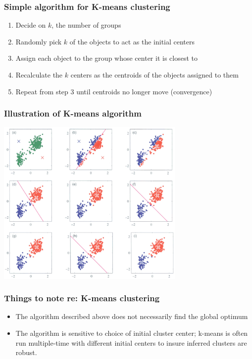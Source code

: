 \documentclass{beamer}
\begin{document}
\begin{frame}
\frametitle{Simple algorithm for K-means clustering}

\begin{enumerate}
\item Decide on $k$, the number of groups

\item Randomly pick $k$ of the objects to act as the initial centers

\item Assign each object to the group whose center it is closest to

\item Recalculate the $k$ centers as the centroids of the objects assigned to them

\item Repeat from step 3 until centroids no longer move (convergence)

\end{enumerate}

\end{frame}

\begin{frame}
\frametitle{Illustration of K-means algorithm}
\begin{center}
\includegraphics[height=3.2in]{k-means-fig.jpg}    
\end{center}
\end{frame}

\begin{frame}
\frametitle{Things to note re: K-means clustering}
\begin{itemize}
\item The algorithm described above does not necessarily find the global optimum

\bigskip

\item The algorithm is sensitive to choice of initial cluster center; k-means is often run multiple-time with different initial centers to insure inferred clusters are robust.    
\end{itemize}
\end{frame}
\end{document}
